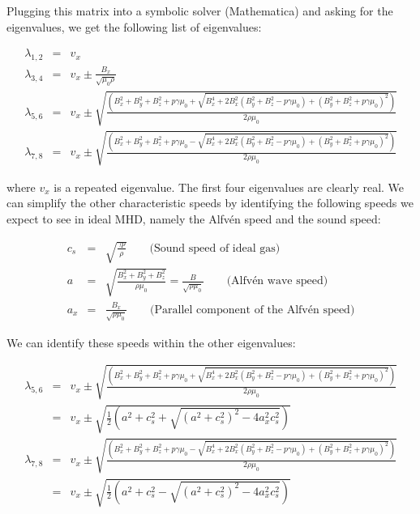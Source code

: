 \documentclass[10pt,letterpaper,notitlepage]{report}
\begin{document}
Plugging this matrix into a symbolic solver (Mathematica) and asking for the eigenvalues, we get the following list of eigenvalues:

\begin{eqnarray}
\lambda_{1, 2} & = & v_x \\
\lambda_{3, 4} & = & v_x \pm \frac{B_x}{\sqrt{\mu_0 \rho}} \\
\lambda_{5, 6} & = & v_x \pm \sqrt{\frac{\left(B_x ^2 + B_y ^2 + B_z ^2 + p \gamma \mu_0 + \sqrt{B_x ^4 + 2 B_x ^2 (B_y ^2 + B_z ^2 - p \gamma \mu_0) + (B_y ^2 + B_z ^2 + p \gamma \mu_0)^2} \right)}{2 \rho \mu_0}} \\
\lambda_{7, 8} & = & v_x \pm \sqrt{\frac{\left(B_x ^2 + B_y ^2 + B_z ^2 + p \gamma \mu_0 - \sqrt{B_x ^4 + 2 B_x ^2 (B_y ^2 + B_z ^2 - p \gamma \mu_0) + (B_y ^2 + B_z ^2 + p \gamma \mu_0)^2} \right)}{2 \rho \mu_0}}
\end{eqnarray}

where $v_x$ is a repeated eigenvalue. The first four eigenvalues are clearly real. We can simplify the other characteristic speeds by identifying the following speeds we expect to see in ideal MHD, namely the Alfvén speed and the sound speed:

\begin{eqnarray}
c_s & = & \sqrt{\frac{\gamma p}{\rho}} \qquad \text{(Sound speed of ideal gas)}\\
a & = & \sqrt{\frac{B_x ^2 + B_y ^2 + B_z ^2}{\rho \mu_0}} =  \frac{B}{\sqrt{\rho \mu_0}} \qquad \text{(Alfvén wave speed)} \\
a_x & = & \frac{B_x}{\sqrt{\rho \mu_0}} \qquad \text{(Parallel component of the Alfvén speed)}
\end{eqnarray}

We can identify these speeds within the other eigenvalues:

\begin{eqnarray}
\lambda_{5, 6} & = & v_x \pm \sqrt{\frac{\left(B_x ^2 + B_y ^2 + B_z ^2 + p \gamma \mu_0 + \sqrt{B_x ^4 + 2 B_x ^2 (B_y ^2 + B_z ^2 - p \gamma \mu_0) + (B_y ^2 + B_z ^2 + p \gamma \mu_0)^2} \right)}{2 \rho \mu_0}} \\
& = & v_x \pm \sqrt{\frac{1}{2}\left(a^2 + c_s ^2 + \sqrt{(a^2 + c_s ^2)^2 - 4 a_x ^2 c_s ^2}\right)} \\
\lambda_{7, 8} & = & v_x \pm \sqrt{\frac{\left(B_x ^2 + B_y ^2 + B_z ^2 + p \gamma \mu_0 - \sqrt{B_x ^4 + 2 B_x ^2 (B_y ^2 + B_z ^2 - p \gamma \mu_0) + (B_y ^2 + B_z ^2 + p \gamma \mu_0)^2} \right)}{2 \rho \mu_0}} \\
& = & v_x \pm \sqrt{\frac{1}{2}\left(a^2 + c_s ^2 - \sqrt{(a^2 + c_s ^2)^2 - 4 a_x ^2 c_s ^2}\right)}
\end{eqnarray}
\end{document}
